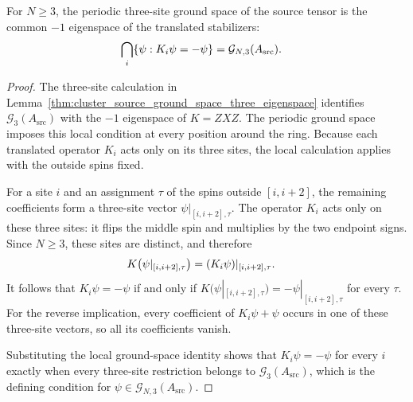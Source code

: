 \begin{lemma}
    \label{thm:cluster_source_stabilizer_chain_ground_space}
    \leanok
    For $N\ge3$, the periodic three-site ground space of the source tensor is
    the common $-1$ eigenspace of the translated stabilizers:
    \begin{align}
        \bigcap_i\{\psi : K_i\psi = -\psi\}
         & = \mathcal G_{N,3}(A_{\mathrm{src}}).\notag
    \end{align}
\end{lemma}
\begin{proof}
    \leanok
    The three-site calculation in
    Lemma~\ref{thm:cluster_source_ground_space_three_eigenspace} identifies
    $\mathcal G_3(A_{\mathrm{src}})$ with the $-1$ eigenspace of $K=ZXZ$.
    The periodic ground space imposes this local condition at every position
    around the ring. Because each translated operator $K_i$ acts only on its
    three sites, the local calculation applies with the outside spins fixed.

    For a site $i$ and an assignment $\tau$ of the spins outside $[i,i+2]$,
    the remaining coefficients form a three-site vector
    $\psi|_{[i,i+2],\tau}$. The operator $K_i$ acts only on these three
    sites: it flips the middle spin and multiplies by the two endpoint
    signs. Since $N\ge3$, these sites are distinct, and therefore
    \begin{align}
        K\bigl(\psi|_{[i,i+2],\tau}\bigr)
         & = (K_i\psi)|_{[i,i+2],\tau}.\notag
    \end{align}
    It follows that $K_i\psi=-\psi$ if and only if
    $K\bigl(\psi|_{[i,i+2],\tau}\bigr)
        =-\psi|_{[i,i+2],\tau}$ for every $\tau$. For the reverse implication,
    every coefficient of $K_i\psi+\psi$ occurs in one of these
    three-site vectors, so all its coefficients vanish.

    Substituting the local ground-space identity shows that
    $K_i\psi=-\psi$ for every $i$ exactly when every three-site
    restriction belongs to $\mathcal G_3(A_{\mathrm{src}})$, which is the
    defining condition for $\psi\in\mathcal G_{N,3}(A_{\mathrm{src}})$.
\end{proof}

